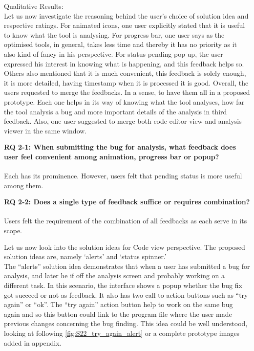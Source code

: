 Qualitative Results: \\

Let us now investigate the reasoning behind the user’s choice of solution idea and respective ratings. For animated icons, one user explicitly stated that it is useful to know what the tool is analysing. For progress bar, one user says as the optimised tools, in general, takes less time and thereby it has no priority as it also kind of fancy in his perspective. For status pending pop up, the user expressed his interest in knowing what is happening, and this feedback helps so. Others also mentioned that it is much convenient,  this feedback is solely enough, it is more detailed, having timestamp when it is processed it is good. Overall, the users requested to merge the feedbacks. In a sense, to have them all in a proposed prototype. Each one helps in its way of knowing what the tool analyses, how far the tool analysis a bug and more important details of the analysis in third feedback. Also, one user suggested to merge both code editor view and analysis viewer in the same window. \\

\begin{myboxi}{{\textbf{RQ 2-1: When submitting the bug for analysis, what feedback does user feel convenient among animation, progress bar or popup?}}}
\\ \\	Each has its prominence. However, users felt that pending status is more useful among them.
\end{myboxi}

\begin{myboxi}{{\textbf{RQ 2-2: Does a single type of feedback suffice or requires combination?}}}
\\ \\	Users felt the requirement of the combination of all feedbacks as each serve in its scope.
\end{myboxi}

Let us now look into the solution ideas for Code view perspective. The proposed solution ideas are, namely ‘alerts’ and ‘status spinner.’ \\


The “alerts” solution idea demonstrates that when a user has submitted a bug for analysis, and later he if off the analysis screen and probably working on a different task. In this scenario,  the interface shows a popup whether the bug fix got succeed or not as feedback. It also has two call to action buttons such as “try again” or “ok”. The “try again” action button help to work on the same bug again and so this button could link to the program file where the user made previous changes concerning the bug finding. This idea could be well understood, looking at following \autoref{fig:S22_try_again_alert} or a complete prototype images added in appendix. \\


